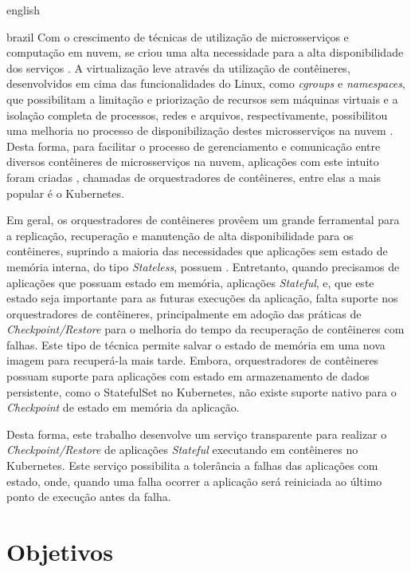 \begin{otherlanguage*}{english}
\begin{otherlanguage*}{brazil}
Com o crescimento de técnicas de utilização de microsserviços e computação em
nuvem, se criou uma alta necessidade para a alta disponibilidade dos serviços
\cite{vayghan2021kubernetes}. A virtualização leve através da utilização de
contêineres, desenvolvidos em cima das funcionalidades do Linux, como \textit{cgroups}
e \textit{namespaces}, que possibilitam a limitação e priorização de recursos sem máquinas
virtuais e a isolação completa de processos, redes e arquivos, respectivamente,
possibilitou uma melhoria no processo de disponibilização destes microsserviços
na nuvem \cite{laadan2010linux}. Desta forma, para facilitar o processo de
gerenciamento e comunicação entre diversos contêineres de microsserviços na
nuvem, aplicações com este intuito foram criadas \cite{vayghan2021kubernetes},
chamadas de orquestradores de contêineres, entre elas a mais popular é
o Kubernetes\cite{kubernetes}.

Em geral, os orquestradores de contêineres provêem um grande ferramental para a
replicação, recuperação e manutenção de alta disponibilidade para os contêineres,
suprindo a maioria das necessidades que aplicações sem estado de memória interna,
do tipo \textit{Stateless}, possuem \cite{vayghan2021kubernetes}. Entretanto,
quando precisamos de aplicações que possuam estado em memória, aplicações
\textit{Stateful}, e, que este estado seja importante para as futuras execuções
da aplicação, falta suporte nos orquestradores de contêineres, principalmente em
adoção das práticas de \textit{Checkpoint/Restore} \cite{muller2022architecture}
para o melhoria do tempo da recuperação de contêineres com falhas. Este tipo de
técnica permite salvar o estado de memória em uma nova imagem para recuperá-la
mais tarde. Embora, orquestradores de contêineres possuam suporte para aplicações
com estado em armazenamento de dados persistente, como o StatefulSet no Kubernetes,
não existe suporte nativo para o \textit{Checkpoint} de estado em memória da
aplicação\cite{tran2022proactive}.

Desta forma, este trabalho desenvolve um serviço transparente para realizar o
\textit{Checkpoint/Restore} de aplicações \textit{Stateful} executando em
contêineres no Kubernetes. Este serviço possibilita a tolerância a falhas
das aplicações com estado, onde, quando uma falha ocorrer a aplicação será reiniciada
ao último ponto de execução antes da falha.

\section{Objetivos}


\end{otherlanguage*}
\end{otherlanguage*}

